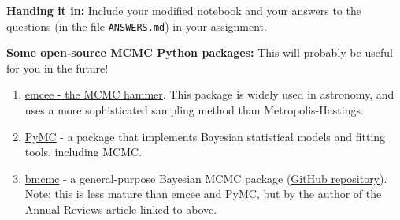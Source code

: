 \documentclass[10pt]{article}
\begin{document}
\noindent \textbf{Handing it in:} Include your modified notebook and
your answers to the questions (in the file \texttt{ANSWERS.md})
in your assignment.

\vspace{5mm}

\noindent
\textbf{Some open-source MCMC Python packages:}  This will probably be useful
for you in the future!

\begin{enumerate}
\item \href{https://emcee.readthedocs.io/en/stable/}{emcee - the MCMC
    hammer}.  This package is widely used in astronomy, and uses a
  more sophisticated sampling method than Metropolis-Hastings.

\item \href{https://www.pymc.io/}{PyMC} - a package that
  implements Bayesian statistical models and fitting tools, including MCMC.

\item \href{https://bmcmc.readthedocs.io/en/latest/}{bmcmc} - a
  general-purpose Bayesian MCMC package  (\href{https://github.com/sanjibs/bmcmc/}{GitHub repository}).
  Note: this is less mature than emcee and PyMC, but by the author of
  the Annual Reviews article linked to above.

\end{enumerate}
\end{document}
